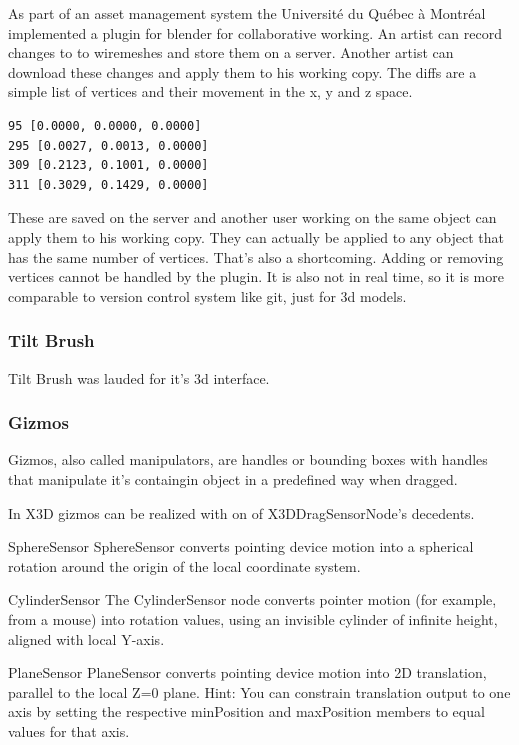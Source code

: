 As part of an asset management system the Université du Québec à
Montréal implemented a plugin for blender for collaborative working. An
artist can record changes to to wiremeshes and store them on a server.
Another artist can download these changes and apply them to his working
copy. The diffs are a simple list of vertices and their movement in the
x, y and z space. \cite{LCR07}

\begin{verbatim}
95 [0.0000, 0.0000, 0.0000]
295 [0.0027, 0.0013, 0.0000]
309 [0.2123, 0.1001, 0.0000]
311 [0.3029, 0.1429, 0.0000]
\end{verbatim}

These are saved on the server and another user working on the same
object can apply them to his working copy. They can actually be applied
to any object that has the same number of vertices. That's also a
shortcoming. Adding or removing vertices cannot be handled by the
plugin. It is also not in real time, so it is more comparable to version
control system like git, just for 3d models.

\subsubsection{Tilt Brush}
\label{tilt-brush20}

Tilt Brush was lauded for it's 3d interface.

\subsubsection{Gizmos}\label{gizmos}

Gizmos, also called manipulators, are handles or bounding boxes with
handles that manipulate it's containgin object in a predefined way when
dragged. \cite{wikigizmo}

In X3D gizmos can be realized with on of X3DDragSensorNode's \cite{x3ddragsensornode} decedents.

\begin{description*}
\item[SphereSensor]
  SphereSensor converts pointing device motion into a spherical rotation around the origin of the local coordinate system. \cite{spheresensor}
\item[CylinderSensor]
  The CylinderSensor node converts pointer motion (for example, from a mouse) into rotation values, using an invisible cylinder of infinite height, aligned with local Y-axis. \cite{cylindersensor}
\item[PlaneSensor]
  PlaneSensor converts pointing device motion into 2D translation, parallel to the local Z=0 plane. Hint: You can constrain translation output to one axis by setting the respective minPosition and maxPosition members to equal values for that axis.
  \cite{planesensor}
\end{description*}


